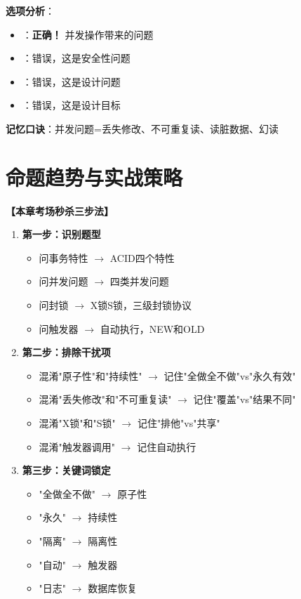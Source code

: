 \documentclass[12pt, a4paper]{article}
\newenvironment{bluebox}[1]{%
  \begin{trivlist}
  \item[\hskip\labelsep \textbf{#1}]
  \setlength{\parskip}{0.5ex}
  \setlength{\itemsep}{0.5ex}
}{%
  \end{trivlist}
  }
\begin{document}
\begin{bluebox}{例题3：并发问题}
	\textbf{选项分析}：
	\begin{itemize}[nosep]
		\item[A) 丢失修改]：\textbf{正确！} 并发操作带来的问题
		\item[B) 非法用户使用]：错误，这是安全性问题
		\item[C) 增加数据冗余]：错误，这是设计问题
		\item[D) 提高数据独立性]：错误，这是设计目标
	\end{itemize}

	\textbf{记忆口诀}：并发问题=丢失修改、不可重复读、读脏数据、幻读
\end{bluebox}

\section{命题趋势与实战策略}

\begin{bluebox}{考场秒杀三步法}
	\textbf{【本章考场秒杀三步法】}

	\begin{enumerate}
		\item \textbf{第一步：识别题型}
		      \begin{itemize}[nosep]
			      \item 问事务特性 $\to$ ACID四个特性
			      \item 问并发问题 $\to$ 四类并发问题
			      \item 问封锁 $\to$ X锁S锁，三级封锁协议
			      \item 问触发器 $\to$ 自动执行，NEW和OLD
		      \end{itemize}

		\item \textbf{第二步：排除干扰项}
		      \begin{itemize}[nosep]
			      \item 混淆"原子性"和"持续性" $\to$ 记住"全做全不做"vs"永久有效"
			      \item 混淆"丢失修改"和"不可重复读" $\to$ 记住"覆盖"vs"结果不同"
			      \item 混淆"X锁"和"S锁" $\to$ 记住"排他"vs"共享"
			      \item 混淆"触发器调用" $\to$ 记住自动执行
		      \end{itemize}

		\item \textbf{第三步：关键词锁定}
		      \begin{itemize}[nosep]
			      \item "全做全不做" $\to$ 原子性
			      \item "永久" $\to$ 持续性
			      \item "隔离" $\to$ 隔离性
			      \item "自动" $\to$ 触发器
			      \item "日志" $\to$ 数据库恢复
		      \end{itemize}
	\end{enumerate}
\end{bluebox}
\end{document}
